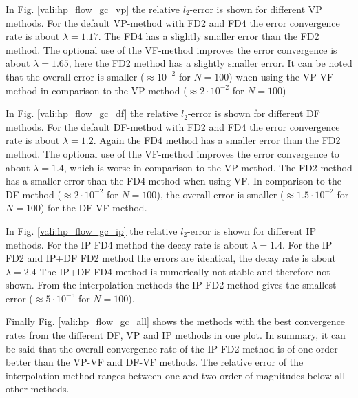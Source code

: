 In Fig. \ref{vali:hp_flow_gc_vp} the relative $l_2$-error is shown for different VP methods.
For the default VP-method with FD2 and FD4 the error convergence rate is about $\lambda=1.17$.
The FD4 has a slightly smaller error than the FD2 method.
The optional use of the VF-method improves the error convergence is about $\lambda=1.65$,
here the FD2 method has a slightly smaller error.
It can be noted that the overall error is smaller ($\approx 10^{-2}$ for $N=100$)
when using the VP-VF-method in comparison to the VP-method ($\approx2\cdot 10^{-2}$ for $N=100$)

In Fig. \ref{vali:hp_flow_gc_df} the relative $l_2$-error is shown for different DF methods.
For the default DF-method with FD2 and FD4 the error convergence rate is about $\lambda=1.2$.
Again the FD4 method has a smaller error than the FD2 method.
The optional use of the VF-method improves the error convergence to about $\lambda=1.4$,
which is worse in comparison to the VP-method. The FD2 method has a smaller error than the FD4 method when using VF.
In comparison to the DF-method ($\approx2\cdot 10^{-2}$ for $N=100$),
the overall error is smaller ($\approx 1.5 \cdot 10^{-2}$ for $N=100$) for the DF-VF-method.

In Fig. \ref{vali:hp_flow_gc_ip} the relative $l_2$-error is shown for different IP methods.
For the IP FD4 method the decay rate is about $\lambda=1.4$.
For the IP FD2 and IP+DF FD2 method the errors are identical, the decay rate is about $\lambda=2.4$
The IP+DF FD4 method is numerically not stable and therefore not shown.
From the interpolation methods the IP FD2 method gives the smallest error  ($\approx 5 \cdot 10^{-5}$ for $N=100$).

Finally Fig. \ref{vali:hp_flow_gc_all} shows the methods  with the best convergence
rates from the different DF, VP and IP methods in one plot.
In summary, it can be said that the overall convergence rate of the IP FD2 method is of one order better
than the VP-VF and DF-VF methods. The relative error of the interpolation method ranges
between one and two order of magnitudes below all other methods.

